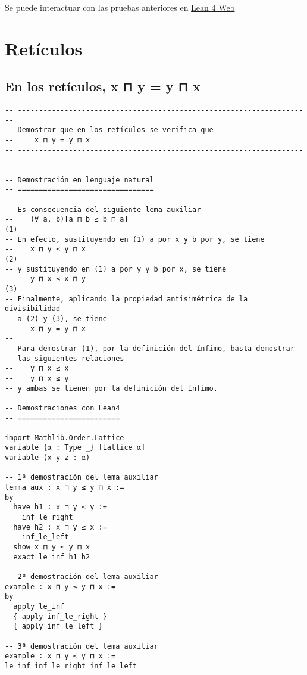 Se puede interactuar con las pruebas anteriores en \href{https://lean.math.hhu.de/\#url=https://raw.githubusercontent.com/jaalonso/Calculemus2/main/src/Conmutatividad\_del\_gcd.lean}{Lean 4 Web}

\chapter{Retículos}
\label{sec:orgd461fd2}

\section{En los retículos, x ⊓ y = y ⊓ x}
\label{sec:org2cb62c5}
\begin{verbatim}
-- ---------------------------------------------------------------------
-- Demostrar que en los retículos se verifica que
--     x ⊓ y = y ⊓ x
-- ----------------------------------------------------------------------

-- Demostración en lenguaje natural
-- ================================

-- Es consecuencia del siguiente lema auxiliar
--    (∀ a, b)[a ⊓ b ≤ b ⊓ a]                                         (1)
-- En efecto, sustituyendo en (1) a por x y b por y, se tiene
--    x ⊓ y ≤ y ⊓ x                                                   (2)
-- y sustituyendo en (1) a por y y b por x, se tiene
--    y ⊓ x ≤ x ⊓ y                                                   (3)
-- Finalmente, aplicando la propiedad antisimétrica de la divisibilidad
-- a (2) y (3), se tiene
--    x ⊓ y = y ⊓ x
--
-- Para demostrar (1), por la definición del ínfimo, basta demostrar
-- las siguientes relaciones
--    y ⊓ x ≤ x
--    y ⊓ x ≤ y
-- y ambas se tienen por la definición del ínfimo.

-- Demostraciones con Lean4
-- ========================

import Mathlib.Order.Lattice
variable {α : Type _} [Lattice α]
variable (x y z : α)

-- 1ª demostración del lema auxiliar
lemma aux : x ⊓ y ≤ y ⊓ x :=
by
  have h1 : x ⊓ y ≤ y :=
    inf_le_right
  have h2 : x ⊓ y ≤ x :=
    inf_le_left
  show x ⊓ y ≤ y ⊓ x
  exact le_inf h1 h2

-- 2ª demostración del lema auxiliar
example : x ⊓ y ≤ y ⊓ x :=
by
  apply le_inf
  { apply inf_le_right }
  { apply inf_le_left }

-- 3ª demostración del lema auxiliar
example : x ⊓ y ≤ y ⊓ x :=
le_inf inf_le_right inf_le_left


\end{verbatim}
